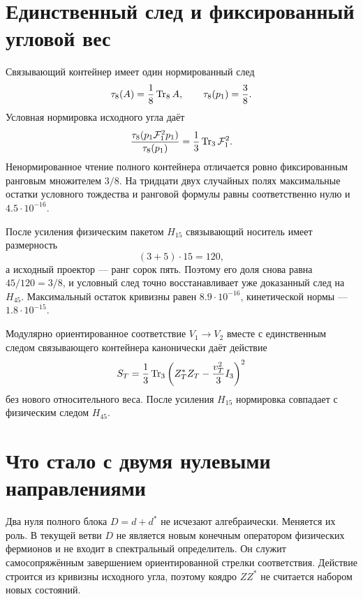 \section{Единственный след и фиксированный угловой вес}

Связывающий контейнер имеет один нормированный след
\begin{equation}
 \tau_8(A)=\frac18\operatorname{Tr}_8A,
 \qquad
 \tau_8(p_1)=\frac38.
\end{equation}
Условная нормировка исходного угла даёт
\begin{equation}
 \frac{\tau_8(p_1\mathcal F_1^2p_1)}{\tau_8(p_1)}
 =\frac13\operatorname{Tr}_3\mathcal F_1^2.
 \label{eq:v6-spin-three-conditioned-source-trace}
\end{equation}
Ненормированное чтение полного контейнера отличается ровно фиксированным
ранговым множителем $3/8$. На тридцати двух случайных полях максимальные
остатки условного тождества и ранговой формулы равны соответственно нулю
и $4.5\cdot10^{-16}$.

После усиления физическим пакетом $H_{15}$ связывающий носитель имеет
размерность
\begin{equation}
 (3+5)\cdot15=120,
\end{equation}
а исходный проектор --- ранг сорок пять. Поэтому его доля снова равна
$45/120=3/8$, и условный след точно восстанавливает уже доказанный след
на $H_{45}$. Максимальный остаток кривизны равен
$8.9\cdot10^{-16}$, кинетической нормы --- $1.8\cdot10^{-15}$.

\begin{theorem}
Модулярно ориентированное соответствие $V_1\to V_2$ вместе с единственным
следом связывающего контейнера канонически даёт действие
\begin{equation}
 S_T=\frac13\operatorname{Tr}_3
 \left(Z_T^*Z_T-\frac{v_T^2}{3}I_3\right)^2
\end{equation}
без нового относительного веса. После усиления $H_{15}$ нормировка
совпадает с физическим следом $H_{45}$.
\end{theorem}

\section{Что стало с двумя нулевыми направлениями}

Два нуля полного блока $D=d+d^*$ не исчезают алгебраически. Меняется их
роль. В текущей ветви $D$ не является новым конечным оператором физических
фермионов и не входит в спектральный определитель. Он служит
самосопряжённым завершением ориентированной стрелки соответствия.
Действие строится из кривизны исходного угла, поэтому коядро $ZZ^*$ не
считается набором новых состояний.

